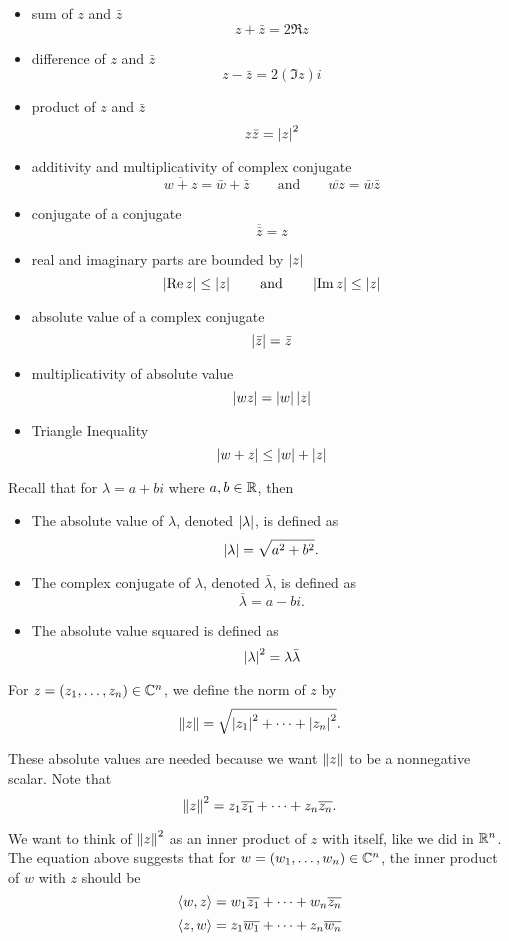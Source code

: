 \begin{itemize}
    \item sum of $z$ and $\bar{z}$ $$z + \bar{z} = 2 \Re z$$
    \item difference of $z$ and $\bar{z}$ $$z - \bar{z} = 2(\Im z)i$$
    \item product of $z$ and $\bar{z}$ $$z  \bar{z} = \left| {z} \right|^2$$
    \item additivity and multiplicativity of complex conjugate $$\overline{w+z} = \bar{w} + \bar{z} \qquad \text{and} \qquad \overline{wz} = \bar{w} \bar{z}$$
    \item conjugate of a conjugate $$\overline{\bar{z}} = z$$
    \item real and imaginary parts are bounded by $\left| {z} \right|$ $$\left| {\operatorname{Re} z} \right| \leq \left| {z} \right| \qquad \text{and} \qquad \left| {\operatorname{Im} z} \right| \leq \left| {z} \right|$$
    \item absolute value of a complex conjugate $$\left| {\bar{z}} \right| = \bar{z}$$
    \item multiplicativity of absolute value $$\left| {wz} \right| = \left| {w} \right| \left| {z} \right|$$
    \item Triangle Inequality $$\left| {w + z} \right| \leq \left| {w} \right| + \left| {z} \right|$$
\end{itemize}
    

\nl Recall that for $\lambda = a + bi$ where $a,b \in \mathbb{R}$, then

\begin{itemize}
    \item The absolute value of $\lambda$, denoted $\left| {\lambda} \right|$, is defined as $$\left| {\lambda} \right| = \sqrt{a^2 + b^2}.$$
    \item The complex conjugate of $\lambda$, denoted $\bar{\lambda}$, is defined as $$\bar{\lambda} = a - bi.$$
    \item The absolute value squared is defined as $$\left| {\lambda} \right|^2 = \lambda \bar{\lambda}$$
\end{itemize}

\nl For $z = ({z}_1, \dots, {z}_n) \in \mathbb{C}^n$, we define the norm of $z$ by
$$\left\| {z} \right\| = \sqrt{\left| {z_1} \right|^2 + \cdots + \left| {z_n} \right|^2}.$$

\nl These absolute values are needed because we want $\left\| {z} \right\|$ to be a nonnegative scalar. Note that 
$$\left\| {z} \right\|^2 = z_1 \overline{z_1} + \cdots + z_n \overline{z_n}.$$

\nl We want to think of $\left\| {z} \right\|^2$ as an inner product of $z$ with itself, like we did in $\mathbb{R}^n$. The equation above suggests that for $w = ({w}_1, \dots, {w}_n) \in \mathbb{C}^n$, the inner product of $w$ with $z$ should be
$$\left\langle{w,z}\right\rangle = w_1 \overline{z_1} + \cdots + w_n \overline{z_n}$$
$$\left\langle{z,w}\right\rangle = z_1 \overline{w_1} + \cdots + z_n \overline{w_n}$$


